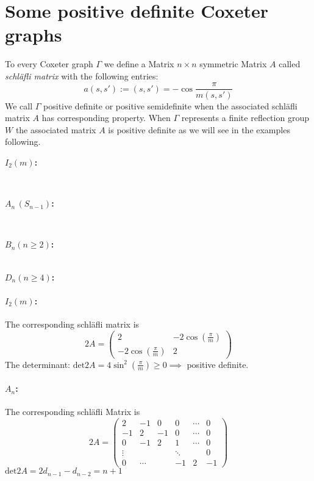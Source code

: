 \documentclass[11pt]{article}
\theoremstyle{plain}
\begin{document}
\section{Some positive definite Coxeter graphs}
To every Coxeter graph $ \Gamma  $  we define a Matrix  $n \times n $ symmetric Matrix $  A $ called \textit{schläfli matrix}  with the following entries:
$$ a (s,s' )  := \left( s, s' \right) = - \cos \frac{\pi}{m \left( s, s' \right) }  $$
We call $ \Gamma  $ positive definite or positive semidefinite when the associated schläfli matrix $ A $ has corresponding property. 
When $ \Gamma  $ represents a finite reflection group $ W $ the associated matrix $ A $ is positive definite as we will see 
in the examples following. 
\\\smallbreak
\noindent\begin{minipage}[b]{0.3\textwidth}
    \textbf{$I_2 (m) $:}
\end{minipage}%
\begin{minipage}[b]{0.2\textwidth}
    
\end{minipage}
\\\smallbreak
\noindent\begin{minipage}[b]{0.3\textwidth}
 \textbf{$A_n \, (S_{n-1}) $:}
\end{minipage}%
\begin{minipage}[b]{0.2\textwidth}
    
\end{minipage}
\\\smallbreak
\noindent\begin{minipage}[b]{0.3\textwidth}
\textbf{$B_n \left( n \geq 2 \right) $:}
\end{minipage}%
\begin{minipage}[b]{0.2\textwidth}
    
\end{minipage}
\\\smallbreak
\noindent \textbf{$D_n \left( n \geq 4 \right) $:} \hspace{5.7em}
\begin{minipage}[h]{1em}

\end{minipage}
\paragraph{$ I_2 (m)$:} 
The corresponding schläfli matrix is 
$$ 2A = \begin{pmatrix}
	2 & -2\cos \left( \frac{\pi}{m}  \right)\\
	-2\cos \left( \frac{\pi}{m}  \right) & 2
\end{pmatrix}
 $$
The determinant: $ \text{det}2A = 4 \sin ^{2}\left( \frac{\pi}{m}  \right) \geq 0  \implies $ positive definite.\\
\smallbreak
\paragraph{ \textbf{$ A_n $}:}The corresponding schläfli Matrix is
$$ 2A = \begin{pmatrix}
	2 & -1 &0 &0 &\cdots &0 \\
	-1 &2 &-1 &0 & \cdots &0 \\
	0 & -1 & 2 &1 & \cdots &0 \\
	\vdots & & & \ddots  & &0 \\
	0 & \cdots & &-1 &2 &-1
\end{pmatrix} $$
$ \text{det} 2A = 2 d_{n-1} -  d_{n-2} = n+1 $ 
\end{document}
